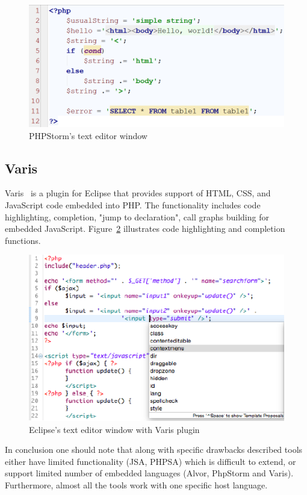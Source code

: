 \begin{figure}[h!]
    \begin{center}
        \includegraphics[scale=0.30]{Figures/PHPStorm.png}
    \end{center}
    \caption{PHPStorm's text editor window}
    \label{PHPStorm_pic}
\end{figure} 

\subsection{Varis}

Varis~\cite{Varis:ref} is a plugin for Eclipse that provides support of HTML, CSS, and JavaScript code embedded into PHP. The functionality includes code highlighting, completion, "jump to declaration", call graphs building for embedded JavaScript. Figure~\ref{varis_pic} illustrates code highlighting and completion functions. 

\begin{figure}[h!]
    \begin{center}
        \includegraphics[scale=0.60]{Figures/Varis.PNG}
    \end{center}
    \caption{Eclipse's text editor window with Varis plugin}
    \label{varis_pic}
\end{figure} 

In conclusion one should note that along with specific drawbacks described tools either have limited functionality (JSA, PHPSA) which is difficult to extend, or support limited number of embedded languages (Alvor, PhpStorm and Varis). Furthermore, almost all the tools work with one specific host language.